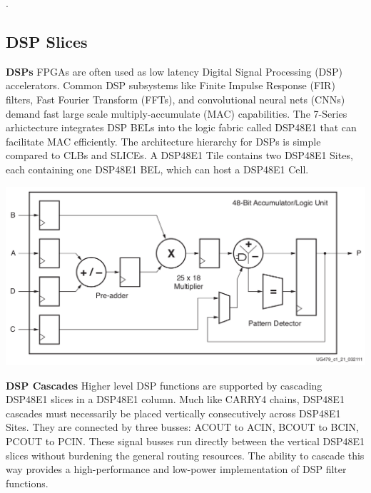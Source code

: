 \documentclass{article}
\begin{document}
        \begin{multicols}{2}
        \vspace{1.0cm}
        .

    \newpage
    \subsection{DSP Slices}

    \textbf{DSPs} \quad 
        FPGAs are often used as low latency Digital Signal Processing (DSP) accelerators. 
        Common DSP subsystems like Finite Impulse Response (FIR) filters, Fast Fourier Transform (FFTs), and convolutional neural nets (CNNs) demand fast large scale multiply-accumulate (MAC) capabilities. 
        The 7-Series arhictecture integrates DSP BELs into the logic fabric called DSP48E1 that can facilitate MAC efficiently. 
        The architecture hierarchy for DSPs is simple compared to CLBs and SLICEs. 
        A DSP48E1 Tile contains two DSP48E1 Sites, each containing one DSP48E1 BEL, which can host a DSP48E1 Cell. 

        {
            \centering
            \includegraphics[width=\columnwidth]{figures/dsp_diagram.png}
            \label{dsp_diagram}
        }
        \vspace{0.5cm}

    \textbf{DSP Cascades} \quad 
        Higher level DSP functions are supported by cascading DSP48E1 slices in a DSP48E1 column.
        Much like CARRY4 chains, DSP48E1 cascades must necessarily be placed vertically consecutively across DSP48E1 Sites. 
        They are connected by three busses: ACOUT to ACIN, BCOUT to BCIN, PCOUT to PCIN.
        These signal busses run directly between the vertical DSP48E1 slices without burdening the general routing resources. 
        The ability to cascade this way provides a high-performance and low-power implementation of DSP filter functions. 


\end{multicols}
\end{document}
